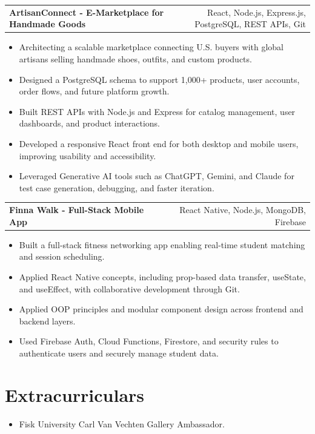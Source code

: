 \documentclass[10pt,letterpaper]{article}
\newcommand{\resumeItemListStart}{\begin{itemize}}
\newcommand{\resumeItemListEnd}{\end{itemize}}
\newcommand{\resumeProjectHeading}[2]{
  \vspace{1pt}
  \begin{tabularx}{\textwidth}{Xr}
    \textbf{#1} & #2 \\
  \end{tabularx}\vspace{-3pt}
}
\begin{document}
\resumeProjectHeading
{ArtisanConnect - E-Marketplace for Handmade Goods} {React, Node.js, Express.js, PostgreSQL, REST APIs, Git}
\resumeItemListStart
    \item Architecting a scalable marketplace connecting U.S. buyers with global artisans selling handmade shoes, outfits, and custom products.
    \item Designed a PostgreSQL schema to support 1,000+ products, user accounts, order flows, and future platform growth.
    \item Built REST APIs with Node.js and Express for catalog management, user dashboards, and product interactions.
    \item Developed a responsive React front end for both desktop and mobile users, improving usability and accessibility.
    \item Leveraged Generative AI tools such as ChatGPT, Gemini, and Claude for test case generation, debugging, and faster iteration.
\resumeItemListEnd

\resumeProjectHeading
{Finna Walk - Full-Stack Mobile App} {React Native, Node.js, MongoDB, Firebase}
\resumeItemListStart
    \item Built a full-stack fitness networking app enabling real-time student matching and session scheduling.
    \item Applied React Native concepts, including prop-based data transfer, useState, and useEffect, with collaborative development through Git.
    \item Applied OOP principles and modular component design across frontend and backend layers.
    \item Used Firebase Auth, Cloud Functions, Firestore, and security rules to authenticate users and securely manage student data.
\resumeItemListEnd

\section*{Extracurriculars}
\resumeItemListStart
    \item Fisk University Carl Van Vechten Gallery Ambassador.
\resumeItemListEnd
\end{document}
